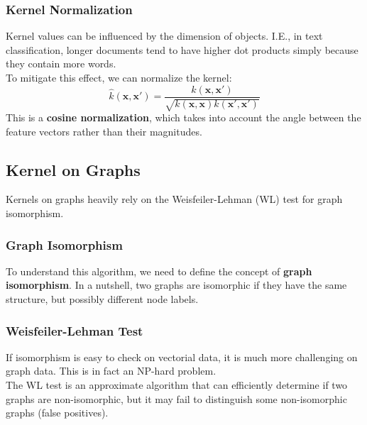 \subsubsection*{Kernel Normalization}
Kernel values can be influenced by the dimension of objects. I.E., in text classification, longer documents tend to have higher dot products simply because they contain more words.
\\To mitigate this effect, we can normalize the kernel:
\begin{equation}
    \hat{k}(\boldsymbol{x}, \boldsymbol{x}') = \frac{k(\boldsymbol{x}, \boldsymbol{x}')}{\sqrt{k(\boldsymbol{x}, \boldsymbol{x}) k(\boldsymbol{x}', \boldsymbol{x}')}}
\end{equation}
This is a \textbf{cosine normalization}, which takes into account the angle between the feature vectors rather than their magnitudes.
\subsection{Kernel on Graphs}
Kernels on graphs heavily rely on the Weisfeiler-Lehman (WL) test for graph isomorphism.
\subsubsection{Graph Isomorphism}
To understand this algorithm, we need to define the concept of \textbf{graph isomorphism}.
In a nutshell, two graphs are isomorphic if they have the same structure, but possibly different node labels.
\subsubsection{Weisfeiler-Lehman Test}
If isomorphism is easy to check on vectorial data, it is much more challenging on graph data. This is in fact an NP-hard problem.
\\The WL test is an approximate algorithm that can efficiently determine if two graphs are non-isomorphic, but it may fail to distinguish some non-isomorphic graphs (false positives).
